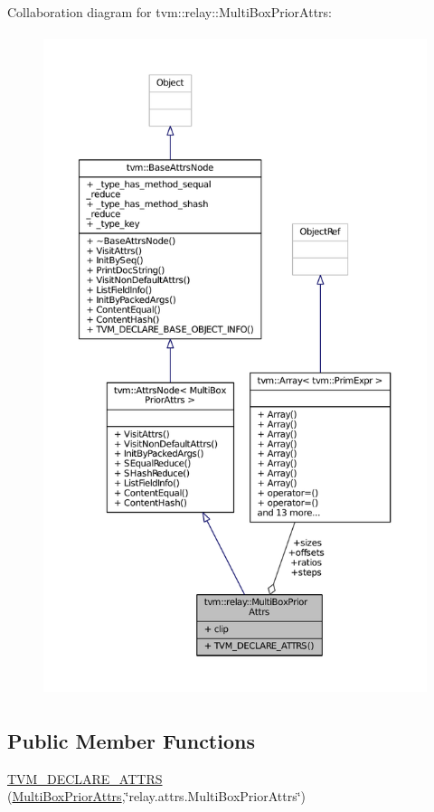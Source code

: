 Collaboration diagram for tvm\+:\+:relay\+:\+:Multi\+Box\+Prior\+Attrs\+:
\nopagebreak
\begin{figure}[H]
\begin{center}
\leavevmode
\includegraphics[height=550pt]{structtvm_1_1relay_1_1MultiBoxPriorAttrs__coll__graph}
\end{center}
\end{figure}
\subsection*{Public Member Functions}
\begin{DoxyCompactItemize}
\item 
\hyperlink{structtvm_1_1relay_1_1MultiBoxPriorAttrs_a71d0cddd5bf4200e98bcd0bd064a12a7}{T\+V\+M\+\_\+\+D\+E\+C\+L\+A\+R\+E\+\_\+\+A\+T\+T\+RS} (\hyperlink{structtvm_1_1relay_1_1MultiBoxPriorAttrs}{Multi\+Box\+Prior\+Attrs},\char`\"{}relay.\+attrs.\+Multi\+Box\+Prior\+Attrs\char`\"{})
\end{DoxyCompactItemize}
